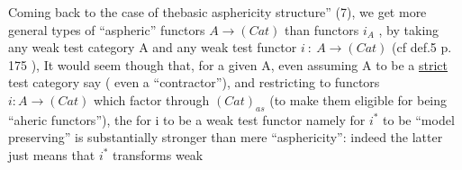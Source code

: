 Coming back to the case of thebasic asphericity structure'' (7),
we get more general types of ``aspheric'' functors $A \longrightarrow (Cat)$ than functors
$i_A$ , by taking any weak test category A and any weak test functor
$i \ : \ A \longrightarrow (Cat)$ (cf def.5 p. 175 ), It would seem though that,
for a given A, even assuming A to be a \uline{strict} test category say ( even
a ``contractor''),  and restricting to functors
$i\colon A \longrightarrow (Cat)$ which factor through $(Cat)_{as}$ (to make them eligible for
being ``aheric functors''), the  for i to be a weak test functor\hand{,}
namely for $i^{*}$ to be ``model preserving''\hand{,} is substantially stronger than
mere ``asphericity'': indeed the latter just means that $i^{*}$ transforms weak

